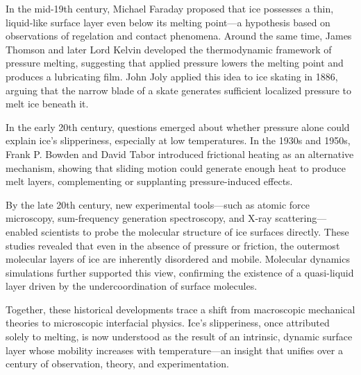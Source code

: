 \begin{historical}
In the mid-19th century, Michael Faraday proposed that ice possesses a thin, liquid-like surface layer even below its melting point—a hypothesis based on observations of regelation and contact phenomena. Around the same time, James Thomson and later Lord Kelvin developed the thermodynamic framework of pressure melting, suggesting that applied pressure lowers the melting point and produces a lubricating film. John Joly applied this idea to ice skating in 1886, arguing that the narrow blade of a skate generates sufficient localized pressure to melt ice beneath it.

In the early 20th century, questions emerged about whether pressure alone could explain ice's slipperiness, especially at low temperatures. In the 1930s and 1950s, Frank P. Bowden and David Tabor introduced frictional heating as an alternative mechanism, showing that sliding motion could generate enough heat to produce melt layers, complementing or supplanting pressure-induced effects.

By the late 20th century, new experimental tools—such as atomic force microscopy, sum-frequency generation spectroscopy, and X-ray scattering—enabled scientists to probe the molecular structure of ice surfaces directly. These studies revealed that even in the absence of pressure or friction, the outermost molecular layers of ice are inherently disordered and mobile. Molecular dynamics simulations further supported this view, confirming the existence of a quasi-liquid layer driven by the undercoordination of surface molecules.

Together, these historical developments trace a shift from macroscopic mechanical theories to microscopic interfacial physics. Ice’s slipperiness, once attributed solely to melting, is now understood as the result of an intrinsic, dynamic surface layer whose mobility increases with temperature—an insight that unifies over a century of observation, theory, and experimentation.
\end{historical}
